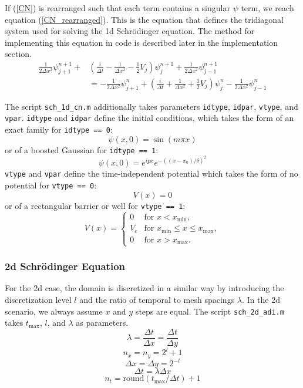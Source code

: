 \documentclass[10pt]{article}
\def\code#1{\texttt{#1}} %
\begin{document}
If (\ref{CN}) is rearranged such that each term contains a singular $\psi$ term, we reach equation
(\ref{CN_rearranged}). This is the equation that defines the tridiagonal system used for solving the 
1d Schrödinger equation. The method for implementing this equation in code is described later in the 
implementation section.
\begin{align}\label{CN_rearranged}
\frac{1}{2 \Delta x^2}\psi_{j+1}^{n+1} + & \left( \frac{i}{\Delta t} - \frac{1}{\Delta x^2}
-\frac{1}{2}V_j \right) \psi_j^{n+1} + \frac{1}{2 \Delta x^2} \psi_{j-1}^{n+1} \nonumber \\
& = -\frac{1}{2 \Delta x^2} \psi_{j+1}^n + \left(\frac{i}{\Delta t} + \frac{1}{\Delta x^2}
+ \frac{1}{2}V_j \right) \psi_j^n - \frac{1}{2 \Delta x^2} \psi_{j-1}^n
\end{align}

The script \code{sch\_1d\_cn.m} additionally takes parameters \code{idtype}, \code{idpar}, 
\code{vtype}, and \code{vpar}. \code{idtype} and \code{idpar} define the initial conditions, 
which takes the form of an exact family for \code{idtype == 0}:
$$\psi(x,0) = \sin(m \pi x)$$
or of a boosted Gaussian for \code{idtype == 1}: 
$$\psi(x,0) = e^{i p x} e^{-((x - x_0)/\delta)^2}$$
\code{vtype} and \code{vpar} define the time-independent potential which takes the form of no 
potential for \code{vtype == 0}:
$$V(x) = 0$$
or of a rectangular barrier or well for \code{vtype == 1}:
$$V(x) =
\begin{cases} 
0 & \text{for } x < x_{\text{min}}, \\
V_c & \text{for } x_{\text{min}} \leq x \leq x_{\text{max}}, \\
0 & \text{for } x > x_{\text{max}}.
\end{cases} $$

\subsubsection*{2d Schrödinger Equation}

For the 2d case, the domain is discretized in a similar way by introducing the discretization 
level $l$ and the ratio of temporal to mesh spacings $\lambda$. In the 2d scenario, we always 
assume $x$ and $y$ steps are equal. The script \code{sch\_2d\_adi.m} takes $t_{\textrm{max}}$, $l$, 
and $\lambda$ as parameters.
$$\lambda = \frac{\Delta t}{\Delta x} = \frac{\Delta t}{\Delta y}$$
$$n_x = n_y = 2^l + 1$$
$$\Delta x = \Delta y = 2^{-l}$$
$$\Delta t = \lambda \Delta x$$
$$n_t = \textrm{round}(t_{\textrm{max}} / \Delta t) + 1$$
\end{document}
